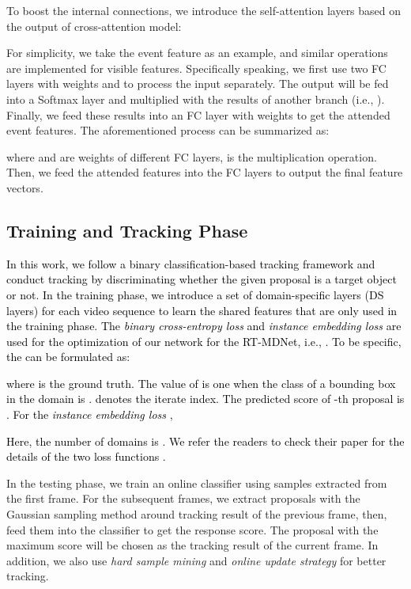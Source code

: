 \documentclass[journal]{IEEEtran}
\begin{document}
To boost the internal connections, we introduce the self-attention layers \cite{wang2018nonlocal} based on the output of cross-attention model: 

For simplicity, we take the event feature  as an example, and similar operations are implemented for visible features. Specifically speaking, we first use two FC layers with weights  and  to process the input  separately. The output will be fed into a Softmax layer and multiplied with the results of another branch (i.e., ). Finally, we feed these results into an FC layer with weights  to get the attended event features. The aforementioned process can be summarized as: 

where  and  are weights of different FC layers,  is the multiplication operation. Then, we feed the attended features into the FC layers to output the final feature vectors. 

 




\subsection{Training and Tracking Phase}  \label{lossfunctions}
\textcolor{black}{
In this work, we follow a binary classification-based tracking framework \cite{Jung_2018_ECCV} and conduct tracking by discriminating whether the given proposal is a target object or not. In the training phase, we introduce a set of domain-specific layers (DS layers) for each video sequence to learn the shared features that are only used in the training phase. The \emph{binary cross-entropy loss}  and \emph{instance embedding loss}  are used for the optimization of our network for the RT-MDNet, i.e., . 
To be specific, the  can be formulated as: 
 
where  is the ground truth. The value of  is one when the class of a bounding box in the domain  is .  denotes the iterate index. The predicted score of -th proposal is . 
For the \emph{instance embedding loss} , 

Here, the number of domains is . We refer the readers to check their paper for the details of the two loss functions \cite{Jung_2018_ECCV}. 
} 


 

In the testing phase, we train an online classifier using samples extracted from the first frame. For the subsequent frames, we extract proposals with the Gaussian sampling method around tracking result of the previous frame, then,  feed them into the classifier to get the response score. The proposal with the maximum score will be chosen as the tracking result of the current frame. In addition, we also use \emph{hard sample mining} and \emph{online update strategy} for better tracking. 
\end{document}
